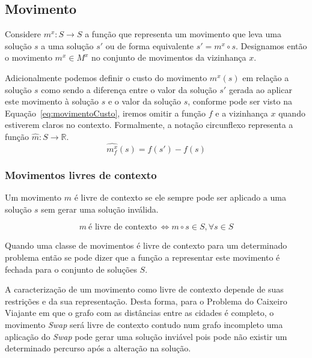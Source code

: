\subsection{Movimento} \label{subsec:movimento}

Considere $m^x: S \rightarrow S$ a função que representa um movimento que leva uma solução $s$ a uma solução $s'$ ou de forma equivalente $s' = m^x \circ s$.
Designamos então o movimento $m^x \in M^x$ no conjunto de movimentos da vizinhança $x$.

Adicionalmente podemos definir o custo do movimento $m^x(s)$ em relação a solução $s$ como sendo a diferença entre o valor da solução $s'$ gerada ao aplicar este movimento à solução $s$ e o valor da solução $s$, conforme pode ser visto na Equação~\ref{eq:movimentoCusto}, iremos omitir a função $f$ e a vizinhança $x$ quando estiverem claros no contexto. Formalmente, a notação circunflexo representa a função $\widehat{m}: S \rightarrow \mathbb{R}$.
\begin{equation} \label{eq:movimentoCusto}
\widehat{m^x_f}(s) = f(s') - f(s)
\end{equation}

\subsubsection{Movimentos livres de contexto} \label{subsubsec:movimentosLivresDeContexto}

Um movimento $m$ é livre de contexto se ele sempre pode ser aplicado a uma solução $s$ sem gerar uma solução inválida.

\begin{equation} \label{eq:movimentoLivreDeContexto}
m \ \textrm{é livre de contexto} \  \iff m \circ s \in S, \forall s \in S
\end{equation}

Quando uma classe de movimentos é livre de contexto para um determinado problema então se pode dizer que a função a representar este movimento é fechada para o conjunto de soluções $S$.

A caracterização de um movimento como livre de contexto depende de suas restrições e da sua representação.
Desta forma, para o Problema do Caixeiro Viajante em que o grafo com as distâncias entre as cidades é completo, o movimento \textit{Swap} será livre de contexto contudo num grafo incompleto uma aplicação do \textit{Swap} pode gerar uma solução inviável pois pode não existir um determinado percurso após a alteração na solução.

